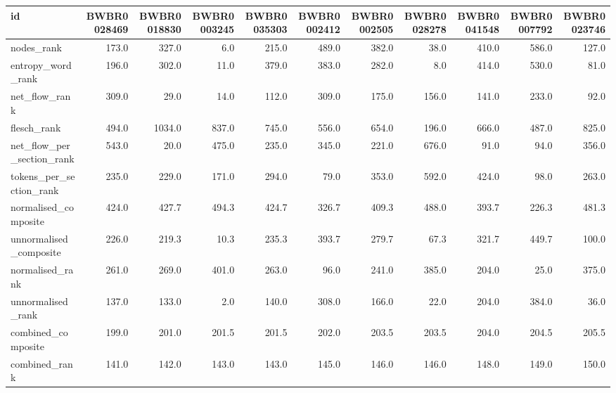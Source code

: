 \begin{tabular}{lrrrrrrrrrr}
\toprule
id & BWBR0028469 & BWBR0018830 & BWBR0003245 & BWBR0035303 & BWBR0002412 & BWBR0002505 & BWBR0028278 & BWBR0041548 & BWBR0007792 & BWBR0023746 \\
\midrule
nodes\_rank & 173.0 & 327.0 & 6.0 & 215.0 & 489.0 & 382.0 & 38.0 & 410.0 & 586.0 & 127.0 \\
\cline{1-11}
entropy\_word\_rank & 196.0 & 302.0 & 11.0 & 379.0 & 383.0 & 282.0 & 8.0 & 414.0 & 530.0 & 81.0 \\
\cline{1-11}
net\_flow\_rank & 309.0 & 29.0 & 14.0 & 112.0 & 309.0 & 175.0 & 156.0 & 141.0 & 233.0 & 92.0 \\
\cline{1-11}
flesch\_rank & 494.0 & 1034.0 & 837.0 & 745.0 & 556.0 & 654.0 & 196.0 & 666.0 & 487.0 & 825.0 \\
\cline{1-11}
net\_flow\_per\_section\_rank & 543.0 & 20.0 & 475.0 & 235.0 & 345.0 & 221.0 & 676.0 & 91.0 & 94.0 & 356.0 \\
\cline{1-11}
tokens\_per\_section\_rank & 235.0 & 229.0 & 171.0 & 294.0 & 79.0 & 353.0 & 592.0 & 424.0 & 98.0 & 263.0 \\
\cline{1-11}
normalised\_composite & 424.0 & 427.7 & 494.3 & 424.7 & 326.7 & 409.3 & 488.0 & 393.7 & 226.3 & 481.3 \\
\cline{1-11}
unnormalised\_composite & 226.0 & 219.3 & 10.3 & 235.3 & 393.7 & 279.7 & 67.3 & 321.7 & 449.7 & 100.0 \\
\cline{1-11}
normalised\_rank & 261.0 & 269.0 & 401.0 & 263.0 & 96.0 & 241.0 & 385.0 & 204.0 & 25.0 & 375.0 \\
\cline{1-11}
unnormalised\_rank & 137.0 & 133.0 & 2.0 & 140.0 & 308.0 & 166.0 & 22.0 & 204.0 & 384.0 & 36.0 \\
\cline{1-11}
combined\_composite & 199.0 & 201.0 & 201.5 & 201.5 & 202.0 & 203.5 & 203.5 & 204.0 & 204.5 & 205.5 \\
\cline{1-11}
combined\_rank & 141.0 & 142.0 & 143.0 & 143.0 & 145.0 & 146.0 & 146.0 & 148.0 & 149.0 & 150.0 \\
\cline{1-11}
\bottomrule
\end{tabular}
